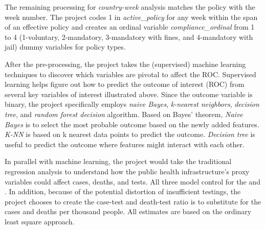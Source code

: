 \documentclass[12pt]{class}
\begin{document}
The remaining processing for \textit{country-week} analysis matches the policy with the week number. The project codes 1 in \textit{active\_policy} for any week within the span of an effective policy and creates an ordinal variable \textit{compliance\_ordinal} from 1 to 4 (1-voluntary, 2-mandatory, 3-mandatory with fines, and 4-mandatory with jail) dummy variables for policy types. \par 

After the pre-processing, the project takes the (supervised) machine learning techniques to discover which variables are pivotal to affect the ROC. Supervised learning helps figure out how to predict the outcome of interest (ROC) from several key variables of interest illustrated above. Since the outcome variable is binary, the project specifically employs \textit{naive Bayes}, \textit{k-nearest neighbors}, \textit{decision tree}, and \textit{random forest decision} algorithm. Based on Bayes' theorem, \textit{Naive Bayes} is to select the most probable outcome based on the newly added features. \textit{K-NN} is based on k nearest data points to predict the outcome. \textit{Decision tree} is useful to predict the outcome where features might interact with each other. \par

In parallel with machine learning, the project would take the traditional regression analysis to understand how the public health infrastructure’s proxy variables could affect cases, deaths, and tests. All three model control for the  and . In addition, because of the potential distortion of insufficient testings, the project chooses to create the case-test and death-test ratio is to substitute for the cases and deaths per thousand people. All estimates are based on the ordinary least square approach. 
\end{document}
